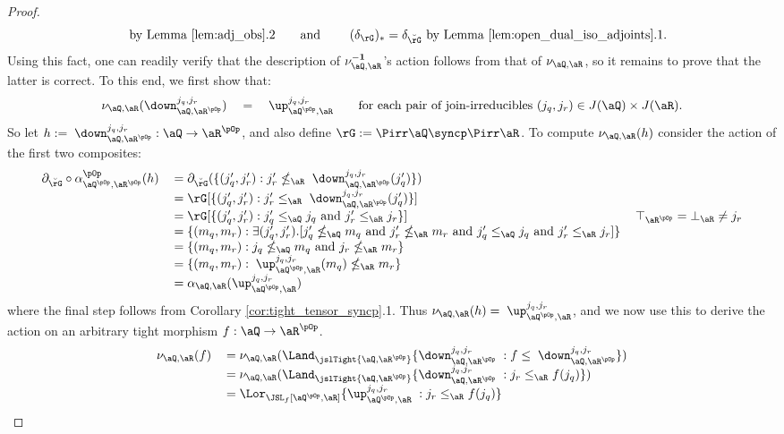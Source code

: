 \documentclass{article}
\begin{document}
\begin{proof}
\[\quad\text{by Lemma \ref{lem:adj_obs}.2}
\qquad\text{and \qquad $(\delta_\rG)_* = \delta_{\breve{\rG}}$ by Lemma \ref{lem:open_dual_iso_adjoints}.1}.
\]
Using this fact, one can readily verify that the description of $\nu_{\aQ,\aR}^{\bf-1}$'s action follows from that of $\nu_{\aQ,\aR}$, so it remains to prove that the latter is correct. To this end, we first show that:
\[
\nu_{\aQ,\aR}(\down_{\aQ,\aR^{\pOp}}^{j_q,j_r}) 
\quad = \quad \up_{\aQ^{\pOp},\aR}^{j_q,j_r}
\qquad
\text{for each pair of join-irreducibles $(j_q,j_r) \in J(\aQ) \times J(\aR)$.}
\]
So let $h := \; \down_{\aQ,\aR^{\pOp}}^{j_q,j_r} : \aQ \to \aR^{\pOp}$, and also define $\rG := \Pirr\aQ \syncp \Pirr\aR$. To compute $\nu_{\aQ,\aR}(h)$ consider the action of the first two composites:
\[
\begin{tabular}{lll}
$\partial_{\breve{\rG}} \circ \alpha_{\aQ^{\pOp},\aR^{\pOp}}^{\pOp}(h)$
&
$= \partial_{\breve{\rG}}(\{ (j'_q,j'_r) : j'_r \nleq_\aR \; \down_{\aQ,\aR^{\pOp}}^{j_q,j_r}(j'_q) \})$
\\[0.5ex]&
$= \rG[ \{ (j'_q,j'_r) : j'_r \leq_\aR \; \down_{\aQ,\aR^{\pOp}}^{j_q,j_r}(j'_q) \} ]$
\\[0.5ex]&
$= \rG[\{ (j'_q,j'_r)  :  j'_q \leq_\aQ j_q \text{ and } j'_r \leq_\aR j_r \}]$
& $\top_{\aR^{\pOp}} = \bot_\aR \neq j_r$
\\&
$=  \{ (m_q,m_r) : \exists (j'_q,j'_r).[ j'_q \nleq_\aQ m_q \text{ and } j'_r \nleq_\aR m_r \text{ and } j'_q \leq_\aQ j_q \text{ and } j'_r \leq_\aR j_r    ] \}$
\\&
$= \{ (m_q,m_r) : j_q \nleq_\aQ m_q \text{ and } j_r \nleq_\aR m_r  \}$
\\&
$= \{ (m_q,m_r) : \; \up_{\aQ^{\pOp},\aR}^{j_q,j_r}(m_q) \nleq_\aR m_r \}$
\\&
$= \alpha_{\aQ,\aR}(\up_{\aQ^{\pOp},\aR}^{j_q,j_r})$
\end{tabular}
\]
where the final step follows from Corollary \ref{cor:tight_tensor_syncp}.1. Thus $\nu_{\aQ,\aR}(h) = \; \up_{\aQ^{\pOp},\aR}^{j_q,j_r}$, and we now use this to derive the action on an arbitrary tight morphism $f : \aQ \to \aR^{\pOp}$.
\[
\begin{tabular}{lll}
$\nu_{\aQ,\aR}(f)$
&
$= \nu_{\aQ,\aR}(\Land_{\jslTight{\aQ,\aR^{\pOp}}} \{ \down_{\aQ,\aR^{\pOp}}^{j_q,j_r} \; : f \leq \; \down_{\aQ,\aR^{\pOp}}^{j_q,j_r}  \})$
\\&
$= \nu_{\aQ,\aR}(\Land_{\jslTight{\aQ,\aR^{\pOp}}} \{ \down_{\aQ,\aR^{\pOp}}^{j_q,j_r} \; :  j_r \leq_\aR f(j_q)  \})$
\\&
$= \Lor_{\JSL_f[\aQ^{\pOp},\aR]} \{ \up_{\aQ^{\pOp},\aR}^{j_q,j_r} \; :  j_r \leq_\aR f(j_q) \}$

\end{tabular}\]
\end{proof}
\end{document}
